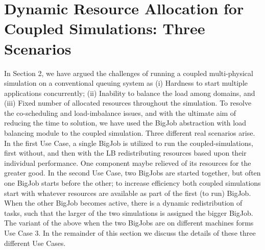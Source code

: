 \documentclass[conference,final]{IEEEtran}
\begin{document}



\section{Dynamic Resource Allocation for Coupled Simulations: Three Scenarios }

In Section 2, we have argued the challenges of running a coupled multi-physical simulation on a conventional queuing system as (i) Hardness to start multiple applications concurrently; (ii) Inability to balance the load among domains, and (iii) Fixed number of allocated resources throughout the simulation.  To resolve the co-scheduling and load-imbalance issues, and with the ultimate aim of reducing the time to solution, we have used the BigJob abstraction with load balancing module to the coupled simulation.
Three different real scenarios arise. In the first Use Case, a single BigJob is utilized to run the coupled-simulations, first without, and then with the LB redistributing resources based upon their individual performance. One component maybe relieved of its resources for the greater good. In the second Use Case, two BigJobs are started together, but often one BigJob starts before the other; to increase efficiency both coupled simulations start with whatever resources are available as part of the first (to run) BigJob. When the other BigJob becomes active, there is a dynamic redistribution of tasks, such that
the larger of the two simulations is assigned the bigger BigJob. The variant of the above when
the two BigJobs are on different machines forms Use Case 3. In the remainder of this section we discuss
the details of these three different Use Cases.

\end{document}
